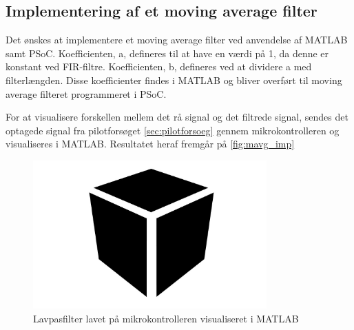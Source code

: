 \subsection{Implementering af et moving average filter}
Det ønskes at implementere et moving average filter ved anvendelse af MATLAB samt PSoC. Koefficienten, a, defineres til at have en værdi på 1, da denne er konstant ved FIR-filtre. Koefficienten, b, defineres ved at dividere a med filterlængden. Disse koefficienter findes i MATLAB og bliver overført til moving average filteret programmeret i PSoC. 

For at visualisere forskellen mellem det rå signal og det filtrede signal, sendes det optagede signal fra pilotforsøget \autoref{sec:pilotforsoeg} gennem mikrokontrolleren og visualiseres i MATLAB. Resultatet heraf fremgår på \autoref{fig:mavg_imp}


\begin{figure}[H]
\centering
\includegraphics[width=0.8\textwidth]{figures/Pilotforsoeg/blackbox}
\caption{Lavpasfilter lavet på mikrokontrolleren visualiseret i MATLAB}
\label{fig:mavg_imp}
\end{figure}
 